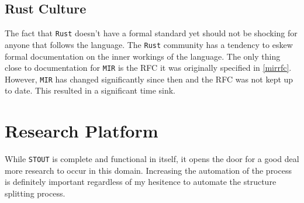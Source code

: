 \documentclass[prodmode,acmtecs]{acmsmall} %
\newcommand{\rustname}{{\texttt{Rust}}}
\def \rust {\rustname{}\xspace}
\newcommand{\mirname}{{\texttt{MIR}}}
\def \mir {\mirname{}\xspace}
\newcommand{\projectname}{{\texttt{STOUT}}}
\def \name{\projectname\xspace}
\begin{document}
\subsection{Rust Culture}
\label{sec:culture}

The fact that \rust doesn't have a formal standard yet should not be shocking
for anyone that follows the language. The \rust community has a tendency
to eskew formal documentation on the inner workings of the language.
The only thing close to documentation for \mir is the RFC it was originally
specified in \ref{mirrfc}. However, \mir has changed significantly since then 
and the RFC was not kept up to date. This resulted in a significant time
sink.

\section{Research Platform}

While \name is complete and functional in itself, it opens the door for 
a good deal more research to occur in this domain. Increasing the automation
of the process is definitely important regardless of my hesitence to automate
the structure splitting process. 





\end{document}
